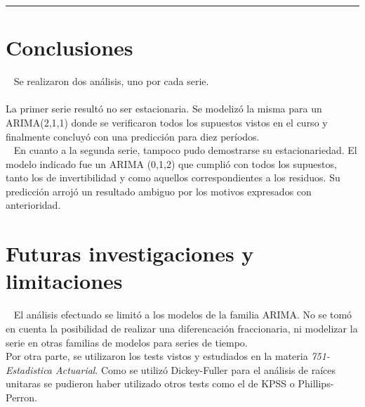 \documentclass[]{article}
\newenvironment{Shaded}{\begin{snugshade}}{\end{snugshade}}
\newcommand{\DataTypeTok}[1]{\textcolor[rgb]{0.13,0.29,0.53}{#1}}
\newcommand{\DecValTok}[1]{\textcolor[rgb]{0.00,0.00,0.81}{#1}}
\newcommand{\KeywordTok}[1]{\textcolor[rgb]{0.13,0.29,0.53}{\textbf{#1}}}
\newcommand{\NormalTok}[1]{#1}
\newcommand{\OperatorTok}[1]{\textcolor[rgb]{0.81,0.36,0.00}{\textbf{#1}}}
\newcommand{\StringTok}[1]{\textcolor[rgb]{0.31,0.60,0.02}{#1}}
\begin{document}
\begin{Shaded}
\end{Shaded}

\begin{center}\rule{0.5\linewidth}{\linethickness}\end{center}

\hypertarget{conclusiones}{%
\section{Conclusiones}\label{conclusiones}}

~ Se realizaron dos análisis, uno por cada serie.\\
\hspace*{0.333em}\\
\hspace*{0.333em} La primer serie resultó no ser estacionaria. Se
modelizó la misma para un ARIMA(2,1,1) donde se verificaron todos los
supuestos vistos en el curso y finalmente concluyó con una predicción
para diez períodos.\\
\hspace*{0.333em} ~ En cuanto a la segunda serie, tampoco pudo
demostrarse su estacionariedad. El modelo indicado fue un ARIMA (0,1,2)
que cumplió con todos los supuestos, tanto los de invertibilidad y como
aquellos correspondientes a los residuos. Su predicción arrojó un
resultado ambiguo por los motivos expresados con anterioridad.

\hypertarget{futuras-investigaciones-y-limitaciones}{%
\section{Futuras investigaciones y
limitaciones}\label{futuras-investigaciones-y-limitaciones}}

~ El análisis efectuado se limitó a los modelos de la familia ARIMA. No
se tomó en cuenta la posibilidad de realizar una diferencación
fraccionaria, ni modelizar la serie en otras familias de modelos para
series de tiempo.\\
\hspace*{0.333em} Por otra parte, se utilizaron los tests vistos y
estudiados en la materia \emph{751-Estadistica Actuarial}. Como se
utilizó Dickey-Fuller para el análisis de raíces unitaras se pudieron
haber utilizado otros tests como el de KPSS o Phillips-Perron.
\end{document}
